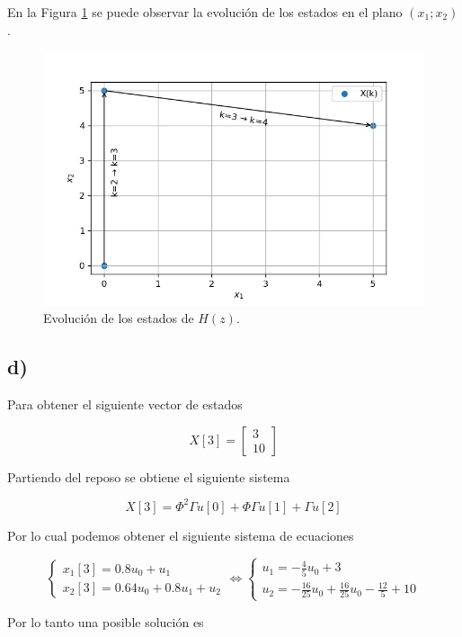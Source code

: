 \documentclass[11pt,a4paper]{article}
\newcommand{\siseq}[1]{ \left\{ \begin{array}{c}
    #1
\end{array} \right. }
\begin{document}
    En la Figura \ref{fig:2-c} se puede observar la evolución de los estados en el plano $(x_1;x_2)$.

    \begin{figure}
        \centering
        \includegraphics[width=.5\textwidth]{Img/2-c.jpg}
        \caption{Evolución de los estados de $H(z)$.}
        \label{fig:2-c}
    \end{figure}

    \subsection*{d)}

    Para obtener el siguiente vector de estados 

    \begin{equation}
        X[3] = 
        \begin{bmatrix}
            3 \\ 10
        \end{bmatrix}
    \end{equation}

    Partiendo del reposo se obtiene el siguiente sistema 

    \begin{equation}
        X[3] = \Phi^2 \Gamma u[0] + \Phi \Gamma u[1] + \Gamma u[2]
    \end{equation}

    Por lo cual podemos obtener el siguiente sistema de ecuaciones 

    \begin{equation}
        \siseq{
            x_1[3] = 0.8 u_0 + u_1 \\ 
            x_2[3] = 0.64 u_0 + 0.8u_1 + u_2
        } \Leftrightarrow
        \siseq{
            u_1 = - \frac{4}{5}u_0 + 3 \\ 
            u_2 = - \frac{16}{25} u_0 + \frac{16}{25}u_0 - \frac{12}{5} + 10
        }
    \end{equation}

    Por lo tanto una posible solución es 
\end{document}
